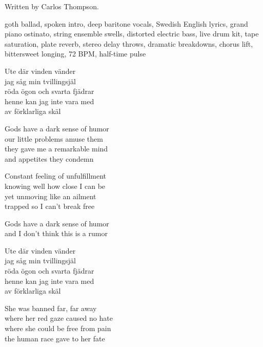 
\begin{notes}
Written by Carlos Thompson.
\end{notes}
\begin{style}
goth ballad, spoken intro, deep baritone vocals, Swedish English lyrics, grand piano ostinato, string ensemble swells, distorted electric bass, live drum kit, tape saturation, plate reverb, stereo delay throws, dramatic breakdowns, chorus lift, bittersweet longing, 72 BPM, half-time pulse
\end{style}
\begin{lyrics}
Ute där vinden vänder\\
jag såg min tvillingsjäl\\
röda ögon och svarta fjädrar\\
henne kan jag inte vara med\\
av förklarliga skäl

Gods have a dark sense of humor\\
our little problems amuse them\\
they gave me a remarkable mind\\
and appetites they condemn

Constant feeling of unfulfillment\\
knowing well how close I can be\\
yet unmoving like an ailment\\
trapped so I can’t break free

Gods have a dark sense of humor\\
and I don’t think this is a rumor

Ute där vinden vänder\\
jag såg min tvillingsjäl\\
röda ögon och svarta fjädrar\\
henne kan jag inte vara med\\
av förklarliga skäl

She was banned far, far away\\
where her red gaze caused no hate\\
where she could be free from pain\\
the human race gave to her fate


\end{lyrics}
